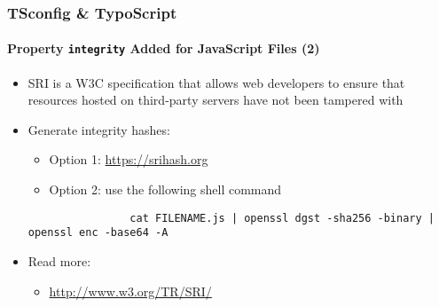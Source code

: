 \begin{frame}[fragile]
	\frametitle{TSconfig \& TypoScript}
	\framesubtitle{Property \texttt{integrity} Added for JavaScript Files (2)}


	\begin{itemize}

		\item SRI is a W3C specification that allows web developers to ensure
			that resources hosted on third-party servers have not been tampered
			with

		\item Generate integrity hashes:

			\begin{itemize}
				\item Option 1: \url{https://srihash.org}
				\item Option 2: use the following shell command
			\end{itemize}

			\begin{lstlisting}
				cat FILENAME.js | openssl dgst -sha256 -binary | openssl enc -base64 -A
			\end{lstlisting}

		\item Read more:

			\begin{itemize}
				\item \url{http://www.w3.org/TR/SRI/}
			\end{itemize}

	\end{itemize}

\end{frame}

